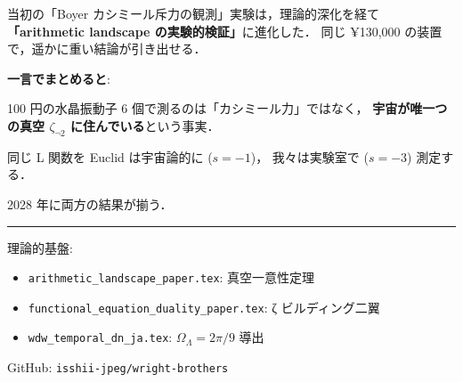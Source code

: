 \documentclass[11pt,a4paper]{article}
\begin{document}
当初の「Boyer カシミール斥力の観測」実験は，理論的深化を経て
\textbf{「arithmetic landscape の実験的検証」}に進化した．
同じ ¥130,000 の装置で，遥かに重い結論が引き出せる．

\begin{tcolorbox}[colback=green!5,colframe=green!60!black]
\textbf{一言でまとめると}:

100 円の水晶振動子 6 個で測るのは「カシミール力」ではなく，
\textbf{宇宙が唯一つの真空 $\zeta_{\neg 2}$ に住んでいる}という事実．

同じ L 関数を Euclid は宇宙論的に ($s = -1$)，
我々は実験室で ($s = -3$) 測定する．

2028 年に両方の結果が揃う．
\end{tcolorbox}

\vspace{1em}
\hrule
\vspace{0.5em}
\small
\noindent
理論的基盤:
\begin{itemize}
\item \texttt{arithmetic\_landscape\_paper.tex}: 真空一意性定理
\item \texttt{functional\_equation\_duality\_paper.tex}: ζ ビルディング二翼
\item \texttt{wdw\_temporal\_dn\_ja.tex}: $\Omega_\Lambda = 2\pi/9$ 導出
\end{itemize}
\noindent
GitHub: \texttt{isshii-jpeg/wright-brothers}
\end{document}
